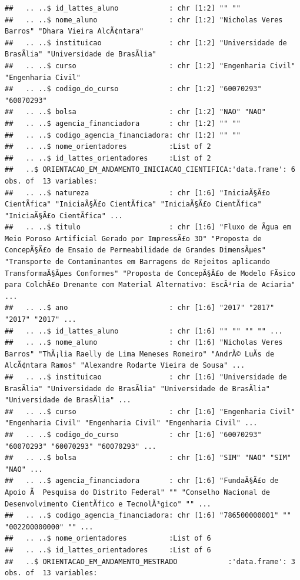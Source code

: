 \documentclass[]{article}
\begin{document}
\begin{verbatim}
##   .. ..$ id_lattes_aluno            : chr [1:2] "" ""
##   .. ..$ nome_aluno                 : chr [1:2] "Nicholas Veres Barros" "Dhara Vieira AlcÃ¢ntara"
##   .. ..$ instituicao                : chr [1:2] "Universidade de BrasÃ­lia" "Universidade de BrasÃ­lia"
##   .. ..$ curso                      : chr [1:2] "Engenharia Civil" "Engenharia Civil"
##   .. ..$ codigo_do_curso            : chr [1:2] "60070293" "60070293"
##   .. ..$ bolsa                      : chr [1:2] "NAO" "NAO"
##   .. ..$ agencia_financiadora       : chr [1:2] "" ""
##   .. ..$ codigo_agencia_financiadora: chr [1:2] "" ""
##   .. ..$ nome_orientadores          :List of 2
##   .. ..$ id_lattes_orientadores     :List of 2
##   ..$ ORIENTACAO_EM_ANDAMENTO_INICIACAO_CIENTIFICA:'data.frame': 6 obs. of  13 variables:
##   .. ..$ natureza                   : chr [1:6] "IniciaÃ§Ã£o CientÃ­fica" "IniciaÃ§Ã£o CientÃ­fica" "IniciaÃ§Ã£o CientÃ­fica" "IniciaÃ§Ã£o CientÃ­fica" ...
##   .. ..$ titulo                     : chr [1:6] "Fluxo de Ãgua em Meio Poroso Artificial Gerado por ImpressÃ£o 3D" "Proposta de ConcepÃ§Ã£o de Ensaio de Permeabilidade de Grandes DimensÃµes" "Transporte de Contaminantes em Barragens de Rejeitos aplicando TransformaÃ§Ãµes Conformes" "Proposta de ConcepÃ§Ã£o de Modelo FÃ­sico para ColchÃ£o Drenante com Material Alternativo: EscÃ³ria de Aciaria" ...
##   .. ..$ ano                        : chr [1:6] "2017" "2017" "2017" "2017" ...
##   .. ..$ id_lattes_aluno            : chr [1:6] "" "" "" "" ...
##   .. ..$ nome_aluno                 : chr [1:6] "Nicholas Veres Barros" "ThÃ¡lia Raelly de Lima Meneses Romeiro" "AndrÃ© LuÃ­s de AlcÃ¢ntara Ramos" "Alexandre Rodarte Vieira de Sousa" ...
##   .. ..$ instituicao                : chr [1:6] "Universidade de BrasÃ­lia" "Universidade de BrasÃ­lia" "Universidade de BrasÃ­lia" "Universidade de BrasÃ­lia" ...
##   .. ..$ curso                      : chr [1:6] "Engenharia Civil" "Engenharia Civil" "Engenharia Civil" "Engenharia Civil" ...
##   .. ..$ codigo_do_curso            : chr [1:6] "60070293" "60070293" "60070293" "60070293" ...
##   .. ..$ bolsa                      : chr [1:6] "SIM" "NAO" "SIM" "NAO" ...
##   .. ..$ agencia_financiadora       : chr [1:6] "FundaÃ§Ã£o de Apoio Ã  Pesquisa do Distrito Federal" "" "Conselho Nacional de Desenvolvimento CientÃ­fico e TecnolÃ³gico" "" ...
##   .. ..$ codigo_agencia_financiadora: chr [1:6] "786500000001" "" "002200000000" "" ...
##   .. ..$ nome_orientadores          :List of 6
##   .. ..$ id_lattes_orientadores     :List of 6
##   ..$ ORIENTACAO_EM_ANDAMENTO_MESTRADO            :'data.frame': 3 obs. of  13 variables:

\end{verbatim}
\end{document}
